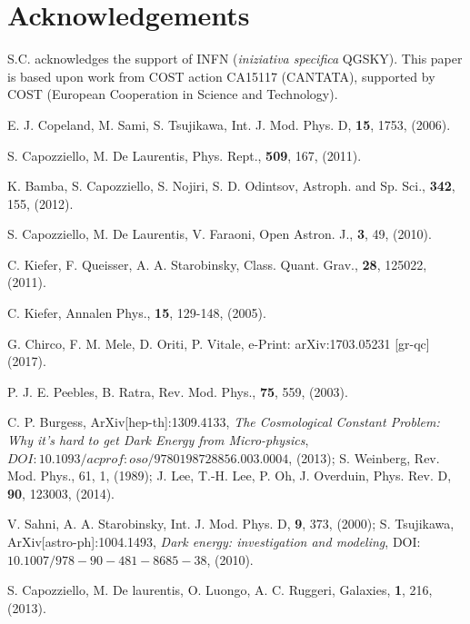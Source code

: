 \documentclass[nofootinbib,prd,superscriptaddress,showpacs,showkeys,]{revtex4}
\begin{document}
\section*{Acknowledgements}

S.C. acknowledges the support of  INFN ({\it iniziativa specifica} QGSKY). This paper is  based upon work from COST action
 CA15117 (CANTATA), supported by COST (European Cooperation in Science and Technology).


\begin{thebibliography}{99}

E. J. Copeland, M. Sami, S. Tsujikawa, Int. J. Mod. Phys. D, {\bf 15}, 1753, (2006).

S. Capozziello, M. De Laurentis, Phys. Rept., {\bf 509}, 167, (2011).

K. Bamba, S. Capozziello, S. Nojiri, S. D. Odintsov, Astroph. and Sp. Sci., {\bf 342}, 155, (2012).

S. Capozziello, M. De Laurentis, V. Faraoni, Open Astron. J., {\bf 3}, 49, (2010).

C. Kiefer, F. Queisser, A. A. Starobinsky, Class. Quant. Grav., {\bf 28}, 125022, (2011).



C. Kiefer, Annalen Phys., {\bf 15}, 129-148, (2005).

G. Chirco, F. M. Mele, D. Oriti, P. Vitale, e-Print: arXiv:1703.05231 [gr-qc] (2017).

P. J. E. Peebles, B. Ratra, Rev. Mod. Phys., {\bf 75}, 559, (2003).

C. P. Burgess, ArXiv[hep-th]:1309.4133, \emph{The Cosmological Constant Problem: Why it's hard to get Dark Energy from Micro-physics}, $DOI:10.1093/acprof: oso/9780198728856.003.0004$, (2013); S. Weinberg, Rev. Mod. Phys., 61, 1, (1989); J. Lee, T.-H. Lee, P. Oh, J. Overduin, Phys. Rev. D, {\bf 90}, 123003, (2014).

V. Sahni, A. A. Starobinsky, Int. J. Mod. Phys. D, {\bf 9}, 373, (2000); S. Tsujikawa, ArXiv[astro-ph]:1004.1493, \emph{Dark energy:
investigation and modeling}, DOI:$10.1007/978−90−481−8685−38$, (2010).

S. Capozziello, M. De laurentis, O. Luongo, A. C. Ruggeri, Galaxies, {\bf 1}, 216, (2013).


\end{thebibliography}
\end{document}
